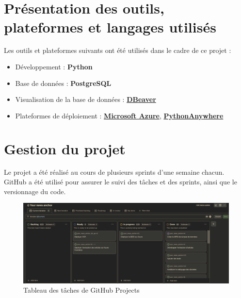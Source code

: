 \documentclass[french]{article}
\begin{document}
    \section{Présentation des outils, plateformes et langages utilisés}

    Les outils et plateformes suivants ont été utilisés dans le cadre de ce projet :
    \begin{itemize}
        \item Développement : \textbf{Python}
        \item Base de données : \textbf{PostgreSQL}
        \item Visualisation de la base de données : \textbf{\href{https://dbeaver.io/}{DBeaver}}
        \item Plateformes de déploiement : \textbf{\href{https://azure.microsoft.com/fr-fr}{Microsoft Azure}}, \textbf{\href{https://www.pythonanywhere.com/}{PythonAnywhere}}
    \end{itemize}
    
    \section{Gestion du projet}
    Le projet a été réalisé au cours de plusieurs sprints d'une semaine chacun. GitHub a été utilisé pour assurer le suivi des tâches et des sprints, ainsi que le versionnage du code.
    
    \begin{figure}[h]
        \includegraphics[width=12cm]{gh_projects}
        \centering
        \caption{Tableau des tâches de GitHub Projects}
        \centering
    \end{figure}
\end{document}
